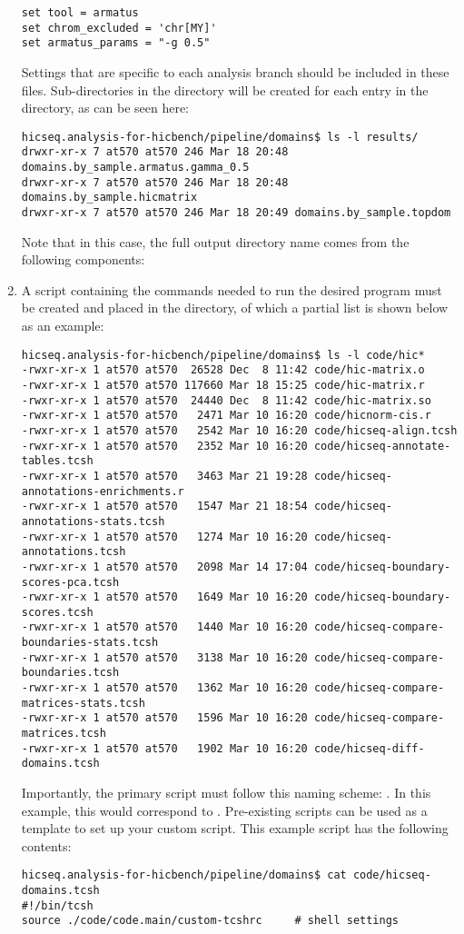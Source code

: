 \begin{enumerate}
\begin{lstlisting}
set tool = armatus
set chrom_excluded = 'chr[MY]'
set armatus_params = "-g 0.5"
\end{lstlisting}
Settings that are specific to each analysis branch should be included in these files. Sub-directories in the  directory will be created for each entry in the  directory, as can be seen here:
\begin{lstlisting}
hicseq.analysis-for-hicbench/pipeline/domains$ ls -l results/
drwxr-xr-x 7 at570 at570 246 Mar 18 20:48 domains.by_sample.armatus.gamma_0.5
drwxr-xr-x 7 at570 at570 246 Mar 18 20:48 domains.by_sample.hicmatrix
drwxr-xr-x 7 at570 at570 246 Mar 18 20:49 domains.by_sample.topdom
\end{lstlisting}
Note that in this case, the full output directory name comes from the following components: 
\item A script containing the commands needed to run the desired program must be created and placed in the  directory, of which a partial list is shown below as an example:
\begin{lstlisting}
hicseq.analysis-for-hicbench/pipeline/domains$ ls -l code/hic*
-rwxr-xr-x 1 at570 at570  26528 Dec  8 11:42 code/hic-matrix.o
-rwxr-xr-x 1 at570 at570 117660 Mar 18 15:25 code/hic-matrix.r
-rwxr-xr-x 1 at570 at570  24440 Dec  8 11:42 code/hic-matrix.so
-rwxr-xr-x 1 at570 at570   2471 Mar 10 16:20 code/hicnorm-cis.r
-rwxr-xr-x 1 at570 at570   2542 Mar 10 16:20 code/hicseq-align.tcsh
-rwxr-xr-x 1 at570 at570   2352 Mar 10 16:20 code/hicseq-annotate-tables.tcsh
-rwxr-xr-x 1 at570 at570   3463 Mar 21 19:28 code/hicseq-annotations-enrichments.r
-rwxr-xr-x 1 at570 at570   1547 Mar 21 18:54 code/hicseq-annotations-stats.tcsh
-rwxr-xr-x 1 at570 at570   1274 Mar 10 16:20 code/hicseq-annotations.tcsh
-rwxr-xr-x 1 at570 at570   2098 Mar 14 17:04 code/hicseq-boundary-scores-pca.tcsh
-rwxr-xr-x 1 at570 at570   1649 Mar 10 16:20 code/hicseq-boundary-scores.tcsh
-rwxr-xr-x 1 at570 at570   1440 Mar 10 16:20 code/hicseq-compare-boundaries-stats.tcsh
-rwxr-xr-x 1 at570 at570   3138 Mar 10 16:20 code/hicseq-compare-boundaries.tcsh
-rwxr-xr-x 1 at570 at570   1362 Mar 10 16:20 code/hicseq-compare-matrices-stats.tcsh
-rwxr-xr-x 1 at570 at570   1596 Mar 10 16:20 code/hicseq-compare-matrices.tcsh
-rwxr-xr-x 1 at570 at570   1902 Mar 10 16:20 code/hicseq-diff-domains.tcsh
\end{lstlisting}
Importantly, the primary script must follow this naming scheme: . In this example, this would correspond to . Pre-existing scripts can be used as a template to set up your custom script. This example script has the following contents:
\begin{lstlisting}
hicseq.analysis-for-hicbench/pipeline/domains$ cat code/hicseq-domains.tcsh
#!/bin/tcsh
source ./code/code.main/custom-tcshrc     # shell settings


\end{lstlisting}
\end{enumerate}
